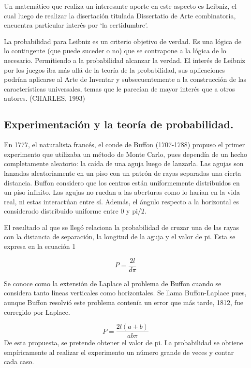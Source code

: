 \documentclass{rbf}
\begin{document}
Un matemático que realiza un interesante aporte en este aspecto es Leibniz, el cual luego de realizar la disertación titulada Dissertatio de Arte combinatoria, encuentra particular interés por ‘la certidumbre’.

La probabilidad para Leibniz es un criterio objetivo de verdad. Es una lógica de lo contingente (que puede suceder o no) que se contrapone a la lógica de lo necesario. Permitiendo a la probabilidad alcanzar la verdad. El interés de Leibniz por los juegos iba más allá de la teoría de la probabilidad, sus aplicaciones podrían aplicarse al Arte de Inventar y subsecuentemente a la construcción de las características universales, temas que le parecían de mayor interés que a otros autores. (CHARLES, 1993)
\subsection{Experimentación y la teoría de probabilidad.}
En 1777, el naturalista francés, el conde de Buffon (1707-1788) propuso el primer experimento que utilizaba un método de Monte Carlo, pues dependía de un hecho completamente aleatorio: la caída de una aguja luego de lanzarla. Las agujas son lanzadas aleatoriamente en un piso con un patrón de rayas separadas una cierta distancia. Buffon considero que los centros están uniformemente distribuidos en un piso infinito. Las agujas no ruedan a las aberturas como lo harían en la vida real, ni estas interactúan entre sí. Además, el ángulo respecto a la horizontal es considerado distribuido uniforme entre 0 y pi/2.

El resultado al que se llegó relaciona la probabilidad de cruzar una de las rayas con la distancia de separación, la longitud de la aguja y el valor de pi. Esta se expresa en la ecuación 1

\begin{equation}
    P=\frac{2l}{d\pi}
\end{equation}

Se conoce como la extensión de Laplace al problema de Buffon cuando se considera tanto líneas verticales como horizontales. Se llama Buffon-Laplace pues, aunque Buffon resolvió este problema contenía un error que más tarde, 1812, fue corregido por Laplace.

\begin{equation}
    P=\frac{2l(a+b)}{ab\pi}
\end{equation}
De esta propuesta, se pretende obtener el valor de pi. La probabilidad se obtiene empíricamente al realizar el experimento un número grande de veces y contar cada caso.
\end{document}
